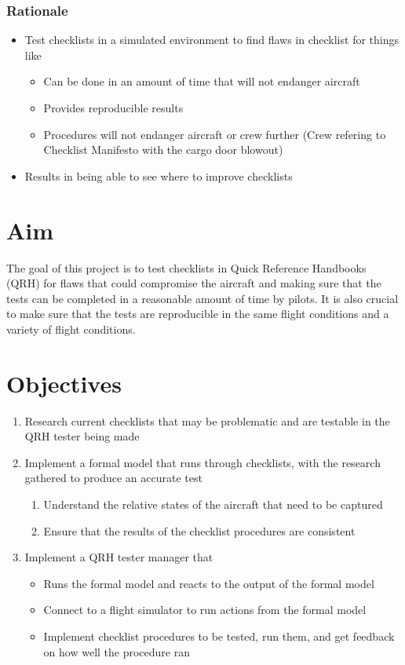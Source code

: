 \documentclass[../dissertation.tex]{subfiles}
\begin{document}
\subsubsection*{Rationale}
\begin{itemize}
    \item Test checklists in a simulated environment 
      to find flaws in checklist for things like
      \begin{itemize}
        \item Can be done in an amount of time that will not endanger aircraft
        \item Provides reproducible results
        \item Procedures will not endanger aircraft or crew further (Crew refering to Checklist Manifesto with the cargo door blowout)
      \end{itemize}
    \item Results in being able to see where to improve checklists
\end{itemize}

\section{Aim}
The goal of this project is to test checklists in Quick Reference Handbooks (QRH)
for flaws that could compromise the aircraft and making sure that the tests can
be completed in a reasonable amount of time by pilots. It is also crucial to make
sure that the tests are reproducible in the same flight conditions and a variety of
flight conditions.

\section{Objectives}
\begin{enumerate}
  \item Research current checklists that may be problematic and are testable
    in the QRH tester being made
  \item Implement a formal model that runs through checklists, with the
    research gathered to produce an accurate test
    \begin{enumerate}
      \item Understand the relative states of the aircraft that need to be captured
      \item Ensure that the results of the checklist procedures are consistent
    \end{enumerate}
  \item Implement a QRH tester manager that
    \begin{itemize}
      \item Runs the formal model and reacts to the output of the formal model
      \item Connect to a flight simulator to run actions from the formal model
      \item Implement checklist procedures to be tested, run them, and get
        feedback on how well the procedure ran
    \end{itemize}
\end{enumerate}
\end{document}
